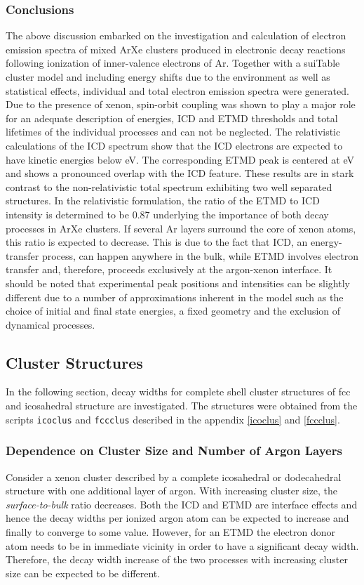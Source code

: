 \subsubsection{Conclusions}
The above discussion embarked on the investigation and calculation of electron
emission spectra of mixed ArXe clusters produced in electronic decay reactions
following ionization of inner-valence electrons of Ar.
Together with a suiTable cluster model and including
energy shifts due to the environment as well as statistical effects,
individual and total electron emission spectra were generated. Due to the
presence of xenon, spin-orbit coupling was shown to play a major role for an
adequate description of energies, ICD and ETMD thresholds and total lifetimes
of the individual processes and can not be neglected. The  relativistic
calculations of the ICD spectrum show that the ICD electrons are expected to
have kinetic energies below \unit[2]{eV}. The corresponding ETMD peak is
centered at \unit[2]{eV} and shows a pronounced overlap with the ICD feature.
These results are in stark contrast to the non-relativistic total spectrum
exhibiting two well separated structures. In the relativistic formulation,
the ratio of the ETMD to ICD intensity is determined to be 0.87 underlying the
importance of both decay processes in ArXe clusters.
If several Ar layers surround the core of xenon atoms,
this ratio is expected to decrease.
This is due to the fact that ICD, an energy-transfer process, can happen
anywhere in the bulk, while ETMD involves electron transfer and, therefore,
proceeds exclusively at the argon-xenon interface. It should be noted that
experimental peak positions and intensities can be slightly different due to
a number of approximations inherent in the model such as the choice of initial
and final state energies, a fixed geometry and
the exclusion of dynamical processes.



\subsection{Cluster Structures}
In the following section, decay widths for complete shell cluster structures
of \ac{fcc} and icosahedral structure are investigated. The structures were
obtained from the scripts \verb|icoclus| and \verb|fccclus| described in
the appendix \ref{icoclus} and \ref{fccclus}.

\subsubsection{Dependence on Cluster Size and Number of Argon Layers}
Consider a xenon cluster described by a complete icosahedral or dodecahedral
structure with one additional layer of argon. With increasing cluster size,
the \emph{surface-to-bulk} ratio decreases. Both the \ac{ICD} and \ac{ETMD}
are interface
effects and hence the decay widths per ionized argon atom can be expected
to increase and finally
to converge to some value. However, for an \ac{ETMD} the electron donor atom
needs to be in immediate vicinity in order to have a significant decay
width. Therefore, the decay width increase of the two processes with increasing
cluster size can be expected to be different.

